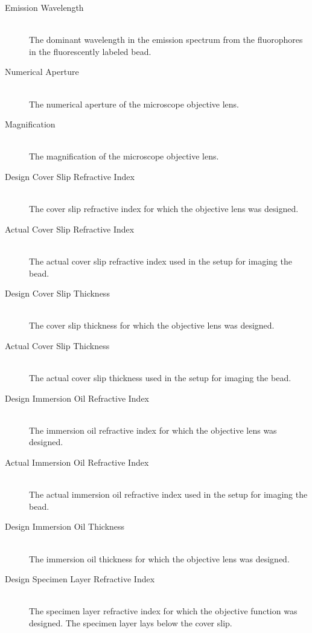 \documentclass[11pt,titlepage,twoside]{article}
\begin{document}
\begin{description}
  \item[Emission Wavelength] \hfill \\
   The dominant wavelength in the emission spectrum from the fluorophores in the fluorescently labeled bead.
  
  \item[Numerical Aperture] \hfill \\
   The numerical aperture of the microscope objective lens.
  
  \item[Magnification] \hfill \\
   The magnification of the microscope objective lens.

  \item[Design Cover Slip Refractive Index] \hfill \\
   The cover slip refractive index for which the objective lens was designed.
  
  \item[Actual Cover Slip Refractive Index] \hfill \\
   The actual cover slip refractive index used in the setup for imaging the bead.
  
  \item[Design Cover Slip Thickness] \hfill \\
   The cover slip thickness for which the objective lens was designed.
  
  \item[Actual Cover Slip Thickness] \hfill \\
   The actual cover slip thickness used in the setup for imaging the bead.
  
  \item[Design Immersion Oil Refractive Index] \hfill \\
   The immersion oil refractive index for which the objective lens was designed.
  
  \item[Actual Immersion Oil Refractive Index] \hfill \\
   The actual immersion oil refractive index used in the setup for imaging the bead.
  
  \item[Design Immersion Oil Thickness] \hfill \\
   The immersion oil thickness for which the objective lens was designed.
  
  \item[Design Specimen Layer Refractive Index] \hfill \\
   The specimen layer refractive index for which the objective function was designed. The specimen layer lays below the cover slip.
  

\end{description}
\end{document}
